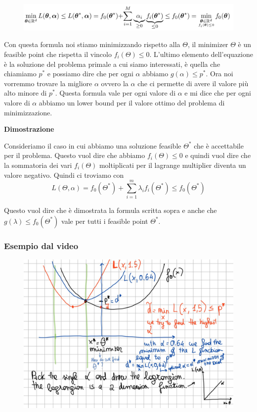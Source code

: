 \documentclass[14pt]{extreport}
\begin{document}
\begin{figure}[H]
	\centering
	\includegraphics[width=\linewidth]{301.jpeg}
\end{figure}

Con questa formula noi stiamo minimizzando rispetto alla $\Theta$, il minimizer $\Theta$ è un feasible point che rispetta il vincolo $f_i(\Theta) \leq
	0$. L'ultimo elemento dell'equazione è la soluzione del problema primale a cui siamo interessati, è quella che chiamiamo $p^*$ e possiamo dire che
	per ogni $\alpha$ abbiamo $g(\alpha) \leq p^*$. Ora noi vorremmo trovare la migliore $\alpha$ ovvero la $\alpha$ che ci permette di avere il
	valore più alto minore di $p^*$. Questa formula vale per ogni valore di $\alpha$ e mi dice che per ogni valore di $\alpha$ abbiamo un lower bound
	per il valore ottimo del problema di minimizzazione.

\textbf{Dimostrazione}

Consideriamo il caso in cui abbiamo una soluzione feasible $\Theta^*$ che è accettabile per il problema. Questo vuol dire che abbiamo $f_i(\Theta)
	\leq 0$ e quindi vuol dire che la sommatoria dei vari $f_i(\Theta)$ moltiplicati per il lagrange multiplier diventa un valore negativo. Quindi ci
	troviamo con $$L(\Theta, \alpha) = f_0(\Theta^*) + \sum_{i=1}^m \lambda_i f_i(\Theta^*) \leq f_0(\Theta^*)$$

Questo vuol dire che è dimostrata la formula scritta sopra e anche che $g(\lambda) \leq f_0(\Theta^*)$ vale per tutti i feasible point $\Theta^*$.


\subsubsection{Esempio dal video}

\begin{figure}[H]
	\centering
	\includegraphics[width=0.7\linewidth]{306.jpeg}
\end{figure}
\end{document}
